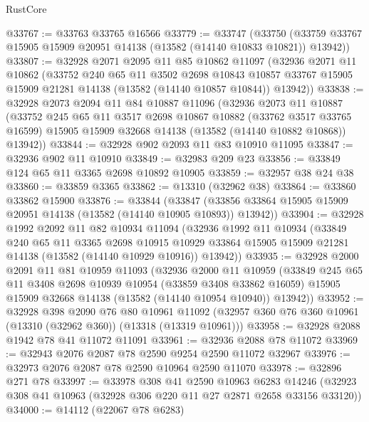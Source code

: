 \begin{lexlean}{RustCore}
\begin{coremodule}
@33767 := @33763 @33765 @16566
@33779 := @33747
    (@33750 (@33759 @33767 @15905 @15909 @20951 @14138 (@13582 (@14140 @10833 @10821)) @13942))
@33807 := @32928
    @2071
    @2095
    @11
    @85
    @10862
    @11097
    (@32936
      @2071
      @11
      @10862
      (@33752
        @240
        @65
        @11
        @3502
        @2698
        @10843
        @10857
        @33767
        @15905
        @15909
        @21281
        @14138
        (@13582 (@14140 @10857 @10844))
        @13942))
@33838 := @32928
    @2073
    @2094
    @11
    @84
    @10887
    @11096
    (@32936
      @2073
      @11
      @10887
      (@33752
        @245
        @65
        @11
        @3517
        @2698
        @10867
        @10882
        (@33762 @3517 @33765 @16599)
        @15905
        @15909
        @32668
        @14138
        (@13582 (@14140 @10882 @10868))
        @13942))
@33844 := @32928 @902 @2093 @11 @83 @10910 @11095
@33847 := @32936 @902 @11 @10910
@33849 := @32983 @209 @23
@33856 := @33849 @124 @65 @11 @3365 @2698 @10892 @10905
@33859 := @32957 @38 @24 @38
@33860 := @33859 @3365
@33862 := @13310 (@32962 @38)
@33864 := @33860 @33862 @15900
@33876 := @33844
    (@33847 (@33856 @33864 @15905 @15909 @20951 @14138 (@13582 (@14140 @10905 @10893)) @13942))
@33904 := @32928
    @1992
    @2092
    @11
    @82
    @10934
    @11094
    (@32936
      @1992
      @11
      @10934
      (@33849
        @240
        @65
        @11
        @3365
        @2698
        @10915
        @10929
        @33864
        @15905
        @15909
        @21281
        @14138
        (@13582 (@14140 @10929 @10916))
        @13942))
@33935 := @32928
    @2000
    @2091
    @11
    @81
    @10959
    @11093
    (@32936
      @2000
      @11
      @10959
      (@33849
        @245
        @65
        @11
        @3408
        @2698
        @10939
        @10954
        (@33859 @3408 @33862 @16059)
        @15905
        @15909
        @32668
        @14138
        (@13582 (@14140 @10954 @10940))
        @13942))
@33952 := @32928
    @398
    @2090
    @76
    @80
    @10961
    @11092
    (@32957 @360 @76 @360 @10961 (@13310 (@32962 @360)) (@13318 (@13319 @10961)))
@33958 := @32928 @2088 @1942 @78 @41 @11072 @11091
@33961 := @32936 @2088 @78 @11072
@33969 := @32943 @2076 @2087 @78 @2590 @9254 @2590 @11072 @32967
@33976 := @32973 @2076 @2087 @78 @2590 @10964 @2590 @11070
@33978 := @32896 @271 @78
@33997 := @33978
    @308
    @41
    @2590
    @10963
    @6283
    @14246
    (@32923 @308 @41 @10963 (@32928 @306 @220 @11 @27 @2871 @2658 @33156 @33120))
@34000 := @14112 (@22067 @78 @6283)

\end{coremodule}
\end{lexlean}

